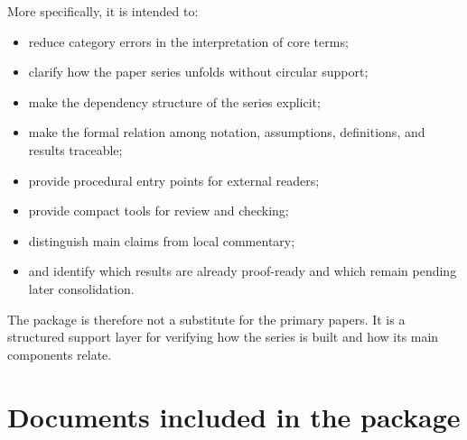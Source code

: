 \documentclass[12pt]{article}
\begin{document}
	More specifically, it is intended to:
	\begin{itemize}[leftmargin=2em]
		\item reduce category errors in the interpretation of core terms;
		\item clarify how the paper series unfolds without circular support;
		\item make the dependency structure of the series explicit;
		\item make the formal relation among notation, assumptions, definitions, and results traceable;
		\item provide procedural entry points for external readers;
		\item provide compact tools for review and checking;
		\item distinguish main claims from local commentary;
		\item and identify which results are already proof-ready and which remain pending later consolidation.
	\end{itemize}
	
	The package is therefore not a substitute for the primary papers. It is a structured support
	layer for verifying how the series is built and how its main components relate.
	
	\section{Documents included in the package}
	
\end{document}
